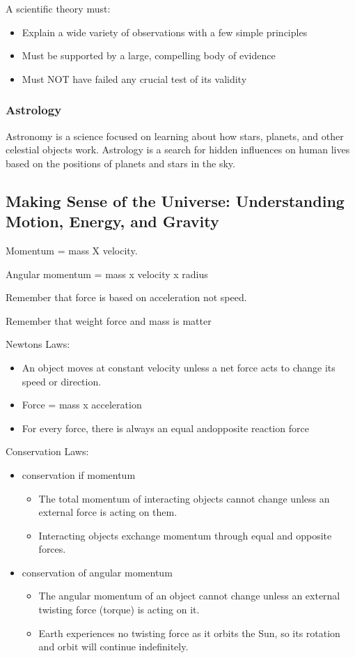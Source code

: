 \documentclass[12pt]{article}
\begin{document}
A scientific theory must:
\begin{itemize}
\item Explain a wide variety of observations with a few simple principles
\item Must be supported by a large, compelling body of evidence
\item Must NOT have failed any crucial test of its validity
\end{itemize}

\subsubsection{Astrology}
Astronomy is a science focused on learning about how stars, planets, and other celestial  objects work. Astrology is a search for hidden influences on  human lives based on the positions of planets  and stars in the sky.

\subsection{Making Sense of the Universe: Understanding Motion, Energy, and Gravity}
Momentum = mass X velocity.

Angular momentum = mass x velocity x radius

Remember that force is based on acceleration not speed.

Remember that weight force and mass is matter

Newtons Laws:
\begin{itemize}
\item An object moves at constant velocity unless a net force acts to change its speed or direction.
\item Force = mass x acceleration
\item For every force, there is always an equal andopposite reaction force
\end{itemize}

Conservation Laws:
\begin{itemize}
\item conservation if momentum
\begin{itemize}
\item The total momentum of interacting objects cannot change unless an external force is acting on them.
\item Interacting objects exchange momentum through equal and opposite forces.
\end{itemize}
\item conservation of angular momentum
\begin{itemize}
\item The angular momentum of an object cannot change unless an external twisting force (torque) is acting on it.
\item Earth experiences no twisting force as it orbits the Sun, so its rotation and orbit will continue indefinitely.
\end{itemize}
\end{itemize}
\end{document}
